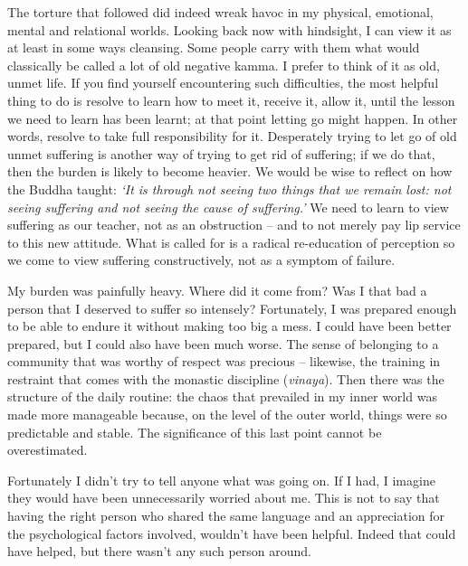 The torture that followed did indeed wreak havoc in my physical,
emotional, mental and relational worlds. Looking back now with
hindsight, I can view it as at least in some ways cleansing. Some people
carry with them what would classically be called a lot of old negative
kamma. I prefer to think of it as old, unmet life. If you find
yourself encountering such difficulties, the most helpful thing to do is
resolve to learn how to meet it, receive it, allow it, until the lesson
we need to learn has been learnt; at that point letting go might happen.
In other words, resolve to take full responsibility for it. Desperately
trying to let go of old unmet suffering is another way of trying to
get rid of suffering; if we do that, then the burden is likely to become
heavier. We would be wise to reflect on how the Buddha taught: \emph{`It
is through not seeing two things that we remain lost: not seeing
suffering and not seeing the cause of suffering.'} We need to learn to
view suffering as our teacher, not as an obstruction -- and to not
merely pay lip service to this new attitude. What is called for is a
radical re-education of perception so we come to view suffering
constructively, not as a symptom of failure.

My burden was painfully heavy. Where did it come from? Was I that bad a
person that I deserved to suffer so intensely? Fortunately, I was
prepared enough to be able to endure it without making too big a mess. I
could have been better prepared, but I could also have been much worse.
The sense of belonging to a community that was worthy of respect was
precious -- likewise, the training in restraint that comes with the
monastic discipline (\emph{vinaya}). Then there was the structure of the
daily routine: the chaos that prevailed in my inner world was made more
manageable because, on the level of the outer world, things were so
predictable and stable. The significance of this last point cannot be
overestimated.

Fortunately I didn't try to tell anyone what was going on. If I had, I
imagine they would have been unnecessarily worried about me. This is not
to say that having the right person who shared the same language and an
appreciation for the psychological factors involved, wouldn't have been
helpful. Indeed that could have helped, but there wasn't any such person
around.

